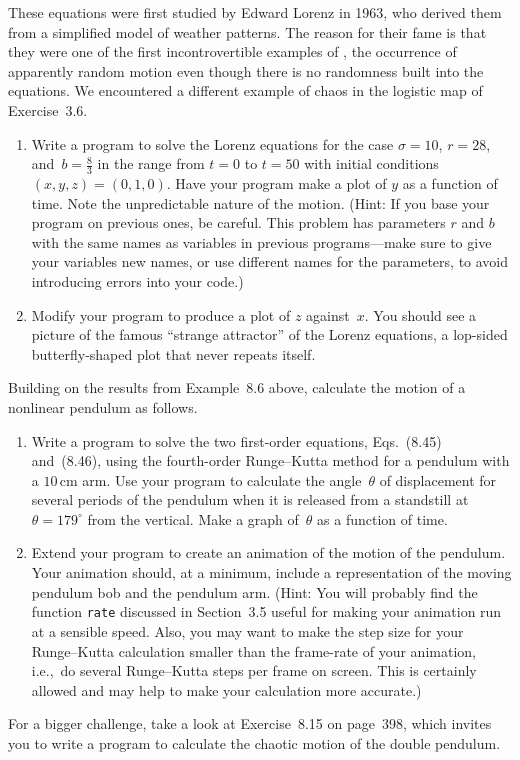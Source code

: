 \documentclass[12pt]{article}
\begin{document}
\begin{exercises}
These equations were first studied by Edward Lorenz in 1963, who
derived them from a simplified model of weather patterns.  The
reason for their fame is that they were one of the first incontrovertible
examples of , the occurrence of apparently
random motion even though there is no randomness built into the equations.
We encountered a different example of chaos in the logistic map of
Exercise~3.6.
\begin{enumerate}\setlength{\itemsep}{0pt}
\item Write a program to solve the Lorenz equations for the case
  $\sigma=10$, $r=28$, and~$b=\frac83$ in the range from $t=0$ to $t=50$
  with initial conditions $(x,y,z)=(0,1,0)$.  Have your program make a plot
  of $y$ as a function of time.  Note the unpredictable nature of the
  motion.  (Hint: If you base your program on previous ones, be careful.
  This problem has parameters $r$ and $b$ with the same names as variables
  in previous programs---make sure to give your variables new names, or use
  different names for the parameters, to avoid introducing errors into your
  code.)
\item Modify your program to produce a plot of $z$ against~$x$.  You should
  see a picture of the famous ``strange attractor'' of the Lorenz
  equations, a lop-sided butterfly-shaped plot that never repeats itself.
\end{enumerate}



\exercise Building on the results from Example~8.6 above, calculate the
motion of a nonlinear pendulum as follows.
\begin{enumerate}\setlength{\itemsep}{0pt}
\item Write a program to solve the two first-order equations, Eqs.~(8.45)
  and~(8.46), using the fourth-order Runge--Kutta method for a pendulum
  with a $10\,$cm arm.  Use your program to calculate the angle~$\theta$ of
  displacement for several periods of the pendulum when it is released from
  a standstill at $\theta=179^\circ$ from the vertical.  Make a graph
  of~$\theta$ as a function of time.
\item Extend your program to create an animation of the motion of the
  pendulum.  Your animation should, at a minimum, include a representation
  of the moving pendulum bob and the pendulum arm.  (Hint: You will
  probably find the function \verb|rate| discussed in Section~3.5 useful
  for making your animation run at a sensible speed.  Also, you may want to
  make the step size for your Runge--Kutta calculation smaller than the
  frame-rate of your animation, i.e.,~do several Runge--Kutta steps per
  frame on screen.  This is certainly allowed and may help to make your
  calculation more accurate.)
\end{enumerate}
For a bigger challenge, take a look at Exercise~8.15 on page~398, which
invites you to write a program to calculate the chaotic motion of the
double pendulum.



\end{exercises}
\end{document}
